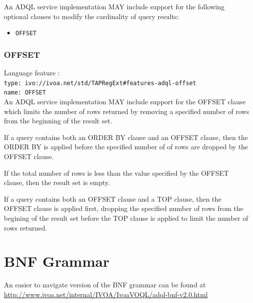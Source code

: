 \documentclass[11pt,a4paper]{ivoa}
\begin{document}
An ADQL service implementation MAY include support for the following optional
clauses to modify the cardinality of query results:

\begin{itemize}
    \item \verb:OFFSET:
\end{itemize}

\subsubsection{OFFSET}
\label{sec:offset}

{\footnotesize Language feature :}\\
{\footnotesize \verb|type: ivo://ivoa.net/std/TAPRegExt#features-adql-offset|}\\
{\footnotesize \verb|name: OFFSET|}\\

An ADQL service implementation MAY include support for the OFFSET clause
which limits the number of rows returned by removing a specified number
of rows from the beginning of the result set.

If a query contains both an ORDER BY clause and an OFFSET clause,
then the ORDER BY is applied before the specified number of 
of rows are dropped by the OFFSET clause.

If the total number of rows is less than the value
specified by the OFFSET clause, then the result set is empty.

If a query contains both an OFFSET clause and a TOP clause,
then the OFFSET clause is applied first, dropping the specified
number of rows from the begining of the result set before the
TOP clause is applied to limit the number of rows returned.

\appendix
\section{BNF Grammar}
\label{sec:grammar}

An easier to navigate version of the BNF grammar can be found at\\
\url{http://www.ivoa.net/internal/IVOA/IvoaVOQL/adql-bnf-v2.0.html}
\end{document}
